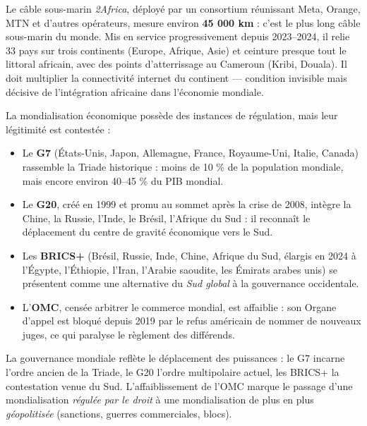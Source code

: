 \documentclass[11pt]{article}
\newcommand{\cle}[1]{{\popxbold\color{popdark}#1}}
\newcounter{popsec}
\newcounter{popsub}
\newcommand{\courssub}[1]{%
  \stepcounter{popsub}%
  \par\vspace{9pt}\noindent{\popxbold\fontsize{11.5}{13}\selectfont\color{popink}{\color{poporange}\thepopsec.\thepopsub}\hspace{6pt}#1}\par\nopagebreak\vspace{4pt}
}
\begin{document}
\begin{savaistu}
Le câble sous-marin \emph{2Africa}, déployé par un consortium réunissant Meta, Orange, MTN et d'autres opérateurs, mesure environ \textbf{45 000 km} : c'est le plus long câble sous-marin du monde. Mis en service progressivement depuis 2023--2024, il relie 33 pays sur trois continents (Europe, Afrique, Asie) et ceinture presque tout le littoral africain, avec des points d'atterrissage au Cameroun (Kribi, Douala). Il doit multiplier la connectivité internet du continent — condition invisible mais décisive de l'intégration africaine dans l'économie mondiale.
\end{savaistu}

\courssub{La gouvernance mondiale : qui décide ?}

La mondialisation économique possède des instances de régulation, mais leur légitimité est contestée :

\begin{itemize}
\item Le \textbf{G7} (États-Unis, Japon, Allemagne, France, Royaume-Uni, Italie, Canada) rassemble la Triade historique : moins de 10 \% de la population mondiale, mais encore environ 40--45 \% du PIB mondial.
\item Le \textbf{G20}, créé en 1999 et promu au sommet après la crise de 2008, intègre la Chine, la Russie, l'Inde, le Brésil, l'Afrique du Sud : il reconnaît le déplacement du centre de gravité économique vers le Sud.
\item Les \textbf{BRICS+} (Brésil, Russie, Inde, Chine, Afrique du Sud, élargis en 2024 à l'Égypte, l'Éthiopie, l'Iran, l'Arabie saoudite, les Émirats arabes unis) se présentent comme une alternative du \emph{Sud global} à la gouvernance occidentale.
\item L'\textbf{OMC}, censée arbitrer le commerce mondial, est affaiblie : son \cle{Organe d'appel} est bloqué depuis 2019 par le refus américain de nommer de nouveaux juges, ce qui paralyse le règlement des différends.
\end{itemize}

\begin{aretenir}
La gouvernance mondiale reflète le déplacement des puissances : le G7 incarne l'ordre ancien de la Triade, le G20 l'ordre multipolaire actuel, les BRICS+ la contestation venue du Sud. L'affaiblissement de l'OMC marque le passage d'une mondialisation \emph{régulée par le droit} à une mondialisation de plus en plus \emph{géopolitisée} (sanctions, guerres commerciales, blocs).
\end{aretenir}
\end{document}
